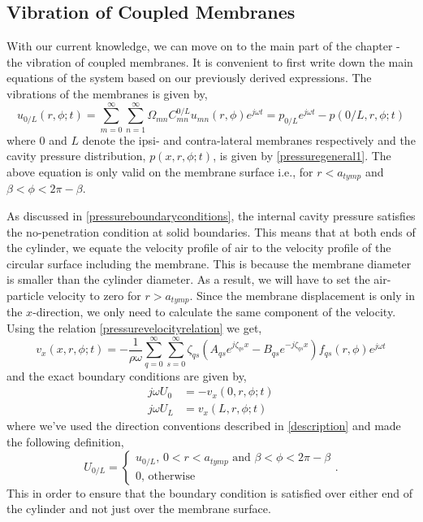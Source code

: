\subsection{Vibration of Coupled Membranes}\label{coupledmembranes}
With our current knowledge, we can move on to the main part of the chapter - the vibration of coupled membranes.
It is convenient to first write down the main equations of the system based on our previously derived expressions.
The vibrations of the membranes is given by,
\begin{equation}\label{coupledmembraneseries}
 u_{0/L}(r,\phi;t)=\displaystyle\sum^{\infty}_{m=0}\sum^{\infty}_{n=1}\Omega_{mn}C^{0/L}_{mn}u_{mn}(r,\phi)e^{j\omega t}=p_{0/L}e^{j\omega t}-p(0/L,r,\phi;t)
\end{equation}
where $0$ and $L$ denote the ipsi- and contra-lateral membranes respectively and the cavity pressure distribution, $p(x,r,\phi;t)$,  is given by \eqref{pressuregeneral1}.
The above equation is only valid on the membrane surface i.e., for $r<a_{tymp}$ and $\beta<\phi<2\pi-\beta$.

As discussed in \ref{pressureboundaryconditions}, the internal cavity pressure satisfies the no-penetration condition at solid boundaries.
This means that at both ends of the cylinder, we equate the velocity profile of air to the velocity profile of the circular surface including
the membrane. This is because the membrane diameter is smaller than the cylinder diameter. As a result, we will have to set the air-particle velocity to zero for $r>a_{tymp}$. 
Since the membrane displacement is
only in the $x$-direction, we only need to calculate the same component of the velocity. Using the relation \eqref{pressurevelocityrelation} we get,
\begin{equation}\label{airvelocity}
v_x(x,r,\phi;t)=-\frac{1}{\rho\omega}\displaystyle\sum^\infty_{q=0}\displaystyle\sum^\infty_{s=0}\zeta_{qs}\left(A_{qs}e^{j\zeta_{qs}x}-B_{qs}e^{-j\zeta_{qs}x}\right)f_{qs}(r,\phi)e^{j\omega t}
\end{equation}
and the exact boundary conditions are given by,
\begin{align}
 j\omega U_{0}&=-v_x(0,r,\phi;t)\label{bc1}\\
 j\omega U_{L}&=v_x(L,r,\phi;t)\label{bc2}
 \end{align}
where we've used the direction conventions described in \ref{description} and made the following definition,
\begin{equation}
 U_{0/L}=\begin{cases}
          u_{0/L}\mbox{, } 0<r<a_{tymp}\mbox{ and } \beta<\phi<2\pi-\beta\\
          0\mbox{, otherwise}
         \end{cases}.
\end{equation}
This in order to ensure that the boundary condition is satisfied over either end of the cylinder and not just over the membrane surface.
